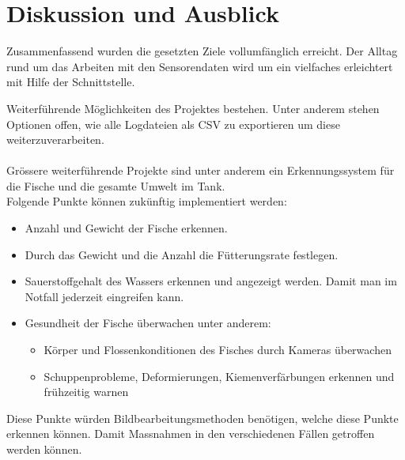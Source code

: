 \documentclass[../main.tex]{subfiles}
\begin{document}
	\section{Diskussion und Ausblick}
	Zusammenfassend wurden die gesetzten Ziele vollumfänglich erreicht. Der Alltag rund um das Arbeiten mit den Sensorendaten wird um ein vielfaches erleichtert mit Hilfe der Schnittstelle. \\
	\par
	\noindent

	Weiterführende Möglichkeiten des Projektes bestehen. Unter anderem stehen Optionen offen, wie alle Logdateien als CSV zu exportieren um diese weiterzuverarbeiten.
	\\ \\
	Grössere weiterführende Projekte sind unter anderem ein Erkennungssystem für die Fische und die gesamte Umwelt im Tank. \\
	Folgende Punkte können zukünftig implementiert werden:
	\begin{itemize}
		\item Anzahl und Gewicht der Fische erkennen.
		\item Durch das Gewicht und die Anzahl die Fütterungsrate festlegen.
		\item Sauerstoffgehalt des Wassers erkennen und angezeigt werden. Damit man im Notfall jederzeit eingreifen kann.
		\item Gesundheit der Fische überwachen unter anderem:
		\begin{itemize}
			\item Körper und Flossenkonditionen des Fisches durch Kameras überwachen
			\item Schuppenprobleme, Deformierungen, Kiemenverfärbungen erkennen und frühzeitig warnen
		\end{itemize}
	\end{itemize}	
	Diese Punkte würden Bildbearbeitungsmethoden benötigen, welche diese Punkte erkennen können. Damit Massnahmen in den verschiedenen Fällen getroffen werden können. 
	\par 
\end{document}
